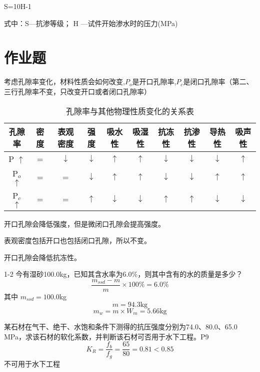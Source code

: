 \documentclass[12pt, a4paper, oneside, UTF8]{ctexbook}
\begin{document}
\begin{definition}
    S=10H-1

式中：S---抗渗等级；
H ---试件开始渗水时的压力(MPa)
\end{definition}

\section{作业题}

\begin{example}
    考虑孔隙率变化，材料性质会如何改变,$P_o$是开口孔隙率,$P_c$是闭口孔隙率（{\color{red}第二、三行孔隙率不变，只改变开口或者闭口孔隙率}）
    \begin{table}[h!]
        \centering
        \begin{tabular}{|c|c|c|c|c|c|c|c|c|c|}
        \hline
        孔隙率 & 密度 & 表观密度 & 强度 & 吸水性 & 吸湿性 & 抗冻性 & 抗渗性 & 导热性 & 吸声性 \\
        \hline
        P $\uparrow$ & = & $\downarrow$ & $\downarrow$ & $\uparrow$ & $\uparrow$ & $\downarrow$ & $\downarrow$ & $\downarrow$ & $\uparrow$ \\
        \hline
        P$_o$ $\uparrow$ & = & = & $\downarrow$ & $\uparrow$ & $\uparrow$ & $\downarrow$ & $\downarrow$ & $\uparrow$ & $\uparrow$ \\
        \hline
        P$_c$ $\uparrow$ & = & = & $\uparrow$ & $\downarrow$ & $\downarrow$ & $\uparrow$ & $\uparrow$ & $\downarrow$ & $\downarrow$ \\
        \hline
        \end{tabular}
        \caption{孔隙率与其他物理性质变化的关系表}
    \end{table}
\end{example}

\begin{remark}
    开口孔隙会降低强度，但是微闭口孔隙会提高强度。

    表观密度包括开口也包括闭口孔隙，所以不变。

    开口孔隙会降低抗冻性。
\end{remark}

\begin{example}
    1-2 今有湿砂100.0kg，已知其含水率为6.0\%，则其中含有的水的质量是多少？
$$
\frac{m_{ssd} - m}{m} \times 100\% = 6.0\%
$$
其中 $m_{ssd} = 100.0$kg
$$
m = 94.3 \text{kg}
$$
$$
m_w = m \times W_m = 5.66 \text{kg}
$$
\end{example}

\begin{example}
某石材在气干、绝干、水饱和条件下测得的抗压强度分别为74.0、80.0、65.0 MPa，求该石材的软化系数，并判断该石材可否用于水下工程。P9
$$
K_R = \frac{f_b}{f_g} = \frac{65}{80} = 0.81 < 0.85
$$
不可用于水下工程
\end{example}
\end{document}
